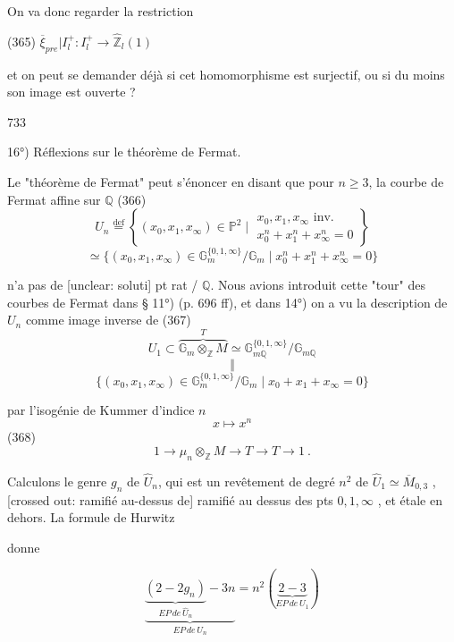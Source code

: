 \newpage


On va donc regarder la restriction

(365) $\overline{\xi}_{pre} | I_l^+ : I_l^+ \to \hat{\mathbb{Z}}_l(1)$

et on peut se demander déjà si cet
homomorphisme est surjectif, ou si
du moins son image est ouverte ?

\newpage


733

16°) Réflexions sur le théorème de Fermat.

Le "théorème de Fermat" peut s'énoncer en
disant que pour $n \ge 3$, la courbe de Fermat
affine sur $\mathbb{Q}$
(366) $$U_n \overset{\text{def}}{=} \left\{ (x_0, x_1, x_\infty) \in \mathbb{P}^2 \mid \begin{matrix} x_0, x_1, x_\infty \text{ inv.} \\ x_0^n + x_1^n + x_\infty^n = 0 \end{matrix} \right\}$$
$$ \simeq \{ (x_0, x_1, x_\infty) \in \mathbb{G}_m^{\{0,1,\infty\}} / \mathbb{G}_m \mid x_0^n + x_1^n + x_\infty^n = 0 \}$$

n'a pas de [unclear: soluti] pt rat / $\mathbb{Q}$. Nous
avions introduit cette "tour" des courbes
de Fermat dans § 11°) (p. 696 ff), et dans
14°) on a vu la description de $U_n$ comme
image inverse de
(367) $$ U_1 \subset \overbrace{\mathbb{G}_m \otimes_\mathbb{Z} M}^{T} \simeq \mathbb{G}_{m \mathbb{Q}}^{\{0,1,\infty\}} / \mathbb{G}_{m \mathbb{Q}} $$
$$ \Vert $$
$$ \{ (x_0, x_1, x_\infty) \in \mathbb{G}_m^{\{0,1,\infty\}} / \mathbb{G}_m \mid x_0 + x_1 + x_\infty = 0 \} $$

par l'isogénie de Kummer d'indice $n$
$$ x \mapsto x^n $$
(368) $$ 1 \to \mu_n \otimes_{\mathbb{Z}} M \to T \longrightarrow T \to 1 \ . $$

Calculons le genre $g_n$ de $\hat{U}_n$, qui est un
revêtement de degré $n^2$ de $\hat{U}_1 \simeq \overline{M}_{0,3}$ ,
[crossed out: ramifié au-dessus de] ramifié au dessus des pts $0, 1, \infty$ , et
étale en dehors. La formule de Hurwitz

\newpage


donne

$$ \underbrace{\underbrace{(2-2g_n)}_{EP \, de \, \hat{U}_n} - 3n}_{EP \, de \, U_n} = n^2 ( \underbrace{2 - 3}_{EP \, de \, U_1} ) $$

